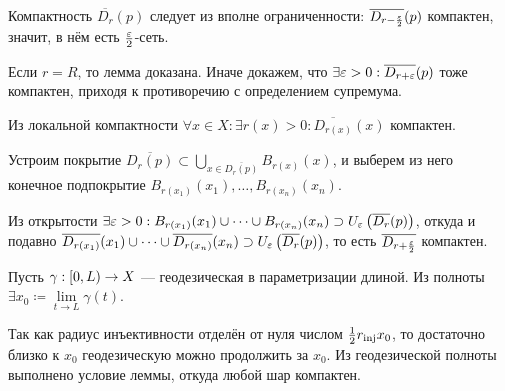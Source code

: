 \documentclass[a4paper]{report}
\begin{document}
{{{{{            \item Компактность $\overline{D_r}(p)$ следует из вполне ограниченности: $\overline{D_{r - \frac{\varepsilon}{2}}}(p)$ компактен, значит, в нём есть $\frac{\varepsilon}{2}$-сеть.
            }
            \item Если $r = R$, то лемма доказана.
                Иначе докажем, что $\exists \varepsilon > 0: \overline{D_{r + \varepsilon}}(p)$ тоже компактен, приходя к противоречию с определением супремума.

                Из локальной компактности $\forall x \in X: \exists r(x) > 0: \overline{D_{r(x)}}(x)\text{ компактен}$.

                Устроим покрытие $\overline{D_r(p)} \subset \bigcup\limits_{x \in \overline{D_r(p)}}B_{r(x)}(x)$, и выберем из него конечное подпокрытие $B_{r(x_1)}(x_1), \dots, B_{r(x_n)}(x_n)$.

                Из открытости $\exists \varepsilon > 0: B_{r(x_1)}(x_1)\cup \dots \cup B_{r(x_n)}(x_n) \supset U_{\varepsilon}\left(\overline{D_r}(p)\right)$, откуда и подавно $\overline{D_{r(x_1)}}(x_1)\cup \dots \cup \overline{D_{r(x_n)}}(x_n) \supset U_{\varepsilon}\left(\overline{D_r}(p)\right)$, то есть $\overline{D_{r + \frac{\varepsilon}2}}$ компактен.\qedhere
            }
            }

    Пусть $\gamma: [0, L) \rightarrow X$ --- геодезическая в параметризации длиной.
            Из полноты $\exists x_0 \coloneqq \lim\limits_{t \to L}\gamma(t)$.

    Так как радиус инъективности отделён от нуля числом $\frac{1}{2}r_{\text{inj}}{x_0}$, то достаточно близко к $x_0$ геодезическую можно продолжить за $x_0$.
    Из геодезической полноты выполнено условие леммы, откуда любой шар компактен.
        }
    }
\end{document}
